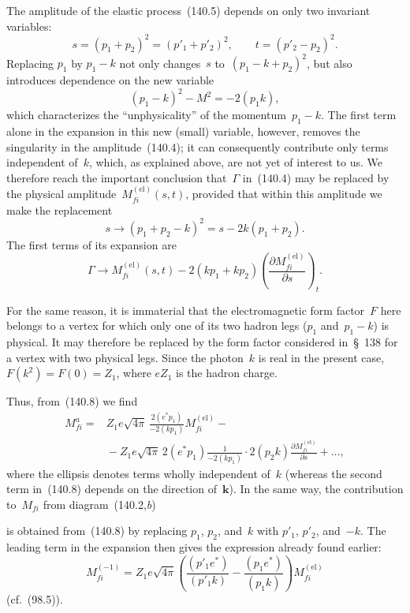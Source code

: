 The amplitude of the elastic process~(140.5) depends on only two invariant variables:
\begin{equation}
s=(p_1+p_2)^2=(p'_1+p'_2)^2,\qquad t=(p'_2-p_2)^2.
\tag{140.6}
\end{equation}
Replacing $p_1$ by $p_1-k$ not only changes~$s$ to~$(p_1-k+p_2)^2$, but also introduces dependence on the new variable
\[
(p_1-k)^2-M^2=-2(p_1k),
\]
which characterizes the ``unphysicality'' of the momentum~$p_1-k$. The first term alone in the expansion in this new (small) variable, however, removes the singularity in the amplitude~(140.4); it can consequently contribute only terms independent of~$k$, which, as explained above, are not yet of interest to us. We therefore reach the important conclusion that~$\Gamma$ in~(140.4) may be replaced by the physical amplitude~$M_{fi}^{(\mathrm{el})}(s,t)$, provided that within this amplitude we make the replacement
\begin{equation}
s\to(p_1+p_2-k)^2=s-2k(p_1+p_2).
\tag{140.7}
\end{equation}
The first terms of its expansion are
\[
\Gamma\to M_{fi}^{(\mathrm{el})}(s,t)
-2(kp_1+kp_2)\left(\frac{\partial M_{fi}^{(\mathrm{el})}}{\partial s}\right)_t.
\]

For the same reason, it is immaterial that the electromagnetic form factor~$F$ here belongs to a vertex for which only one of its two hadron legs ($p_1$ and~$p_1-k$) is physical. It may therefore be replaced by the form factor considered in~\S~138 for a vertex with two physical legs. Since the photon~$k$ is real in the present case, $F(k^2)=F(0)=Z_1$, where $eZ_1$ is the hadron charge.

Thus, from~(140.8) we find
\begin{equation}
\begin{aligned}
M_{fi}^{a}={}&Z_1e\sqrt{4\pi}\,
\frac{2(e^*p_1)}{-2(kp_1)}M_{fi}^{(\mathrm{el})}-{}\\
&{}-Z_1e\sqrt{4\pi}\,2(e^*p_1)\frac{1}{-2(kp_1)}
\cdot2(p_2k)\frac{\partial M_{fi}^{(\mathrm{el})}}{\partial s}+\ldots,
\end{aligned}
\tag{140.8}
\end{equation}
where the ellipsis denotes terms wholly independent of~$k$ (whereas the second term in~(140.8) depends on the direction of~$\mathbf k$). In the same way, the contribution to~$M_{fi}$ from diagram~(140.2,\textit{b})

is obtained from~(140.8) by replacing $p_1$, $p_2$, and~$k$ with $p'_1$, $p'_2$, and~$-k$. The leading term in the expansion then gives the expression already found earlier:
\begin{equation}
M_{fi}^{(-1)}=Z_1e\sqrt{4\pi}
\left(\frac{(p'_1e^*)}{(p'_1k)}-\frac{(p_1e^*)}{(p_1k)}\right)
M_{fi}^{(\mathrm{el})}
\tag{140.9}
\end{equation}
(cf.~(98.5)).

